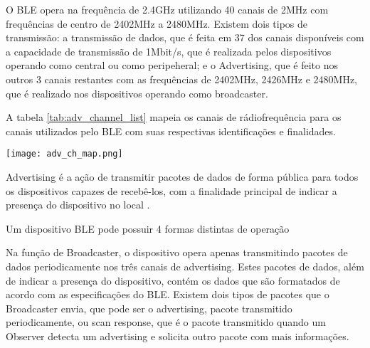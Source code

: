 O BLE opera na frequência de 2.4GHz utilizando 40 canais de 2MHz com
frequências de centro de 2402MHz a 2480MHz. Existem dois tipos de transmissão: a
transmissão de dados, que é feita em 37 dos canais disponíveis com a capacidade
de transmissão de 1Mbit/s, que é realizada pelos dispositivos operando como
central ou como peripeheral; e o Advertising, que é feito nos outros 3 canais
restantes com as frequências de 2402MHz, 2426MHz e 2480MHz, que
é realizado nos dispositivos operando como broadcaster.\cite{ble4core}

A tabela \ref{tab:adv_channel_list} mapeia os canais de rádiofrequência para os canais
utilizados pelo BLE com suas respectivas identificações e finalidades. 

\begin{center}
	\centering 
	\texttt{[image: adv\_ch\_map.png]}
	\label{tab:adv_channel_list}
\end{center} 
 
 
Advertising é a ação de transmitir pacotes de dados de forma pública para todos
os dispositivos capazes de recebê-los, com a finalidade principal de indicar a
presença do dispositivo no local \cite{ble4core}.

% 
% 
% 

Um dispositivo BLE pode possuir 4 formas distintas de operação

    
    

Na função de Broadcaster, o dispositivo opera apenas transmitindo pacotes de dados periodicamente nos três canais de advertising. 
Estes pacotes de dados, além de indicar a presença do dispositivo, contém os dados que são formatados de acordo com as especificações do BLE. 
Existem dois tipos de pacotes que o Broadcaster envia, que pode ser o advertising, pacote transmitido periodicamente, ou scan response,
que é o pacote transmitido quando um Observer detecta um advertising e solicita outro pacote com mais informações.

